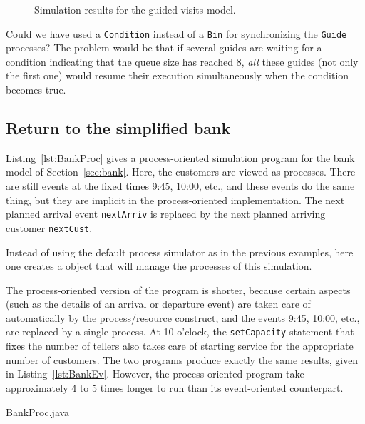 \begin{figure}[ht]
\centerline{}
\caption {Simulation results for the guided visits model.}
\label {fig:visits-res}
\end{figure}
\fi  %

Could we have used a \texttt{Condition} instead of a \texttt{Bin}
for synchronizing the \texttt{Guide} processes?
The problem would be that if several guides are waiting for a
condition indicating that the queue size has reached 8,
{\em all\/} these guides (not only the first one)
would resume their execution
simultaneously when the condition becomes true.


\subsection {Return to the simplified bank}
\label {sec:bank-proc}

Listing~\ref{lst:BankProc} gives a process-oriented simulation
program for the bank model of Section~\ref{sec:bank}.
Here, the customers are viewed as processes.
There are still events at the fixed times 9:45, 10:00, etc.,
and these events do the same thing,
but they are implicit in the process-oriented implementation.
The next planned arrival event \texttt{nextArriv} is replaced by the
next planned arriving customer \texttt{nextCust}.

Instead of using the default process simulator as in the previous
examples, here one creates a  object that
will manage the processes of this simulation.

The process-oriented version of the program is shorter,
because certain aspects (such as the details of an arrival
or departure event) are taken care of automatically by the
process/resource construct, and the events 9:45, 10:00, etc.,
are replaced by a single process.
At 10 o'clock, the \texttt{setCapacity} statement that fixes the
number of tellers also takes
care of starting service for the appropriate number of customers.
The two programs produce exactly the same results, given in
Listing~\ref{lst:BankEv}.
However, the process-oriented program take approximately 4 to 5 times
longer to run than its event-oriented counterpart.


%
{BankProc.java}

